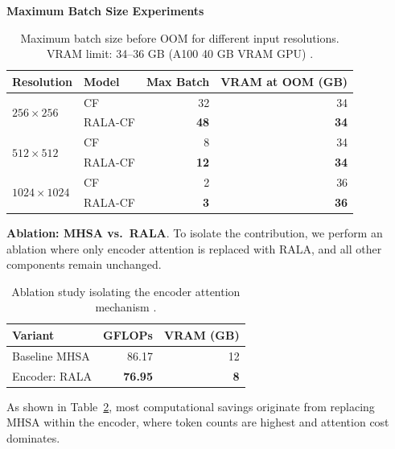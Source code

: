 \documentclass[runningheads]{llncs}
\begin{document}
\noindent \textbf{Maximum Batch Size Experiments}

\begin{table}
\caption{Maximum batch size before OOM for different input resolutions. VRAM limit: 34--36 GB (A100 40 GB VRAM GPU) \cite{acuna2026efficient}.}
\label{tab:batch_multires}
\centering
\begin{tabularx}{\textwidth}{|l|X|r|r|}
\hline
\textbf{Resolution} & \textbf{Model} & \textbf{Max Batch} & \textbf{VRAM at OOM (GB)} \\
\hline
\multirow{2}{*}{$256\times256$}
  & CF      & 32 & 34 \\
  & RALA-CF & \textbf{48} & \textbf{34} \\
\hline
\multirow{2}{*}{$512\times512$}
  & CF      & 8  & 34 \\
  & RALA-CF & \textbf{12} & \textbf{34} \\
\hline
\multirow{2}{*}{$1024\times1024$}
  & CF      & 2  & 36 \\
  & RALA-CF & \textbf{3}  & \textbf{36} \\
\hline
\end{tabularx}
\end{table}

\noindent \textbf{Ablation: MHSA vs.\ RALA}. To isolate the contribution, we
perform an ablation where only encoder attention is replaced with RALA, and all
other components remain unchanged.

\begin{table}
\caption{Ablation study isolating the encoder attention mechanism \cite{acuna2026efficient}.}
\label{tab:ablation}
\centering
\begin{tabularx}{\textwidth}{|X|r|r|}
\hline
\textbf{Variant} & \textbf{GFLOPs} & \textbf{VRAM (GB)} \\
\hline
Baseline MHSA & 86.17 & 12 \\
\rowcolor{pastelorange}
Encoder: RALA & \textbf{76.95} & \textbf{8} \\
\hline
\end{tabularx}
\end{table}

\noindent As shown in Table~\ref{tab:ablation}, most computational savings
originate from replacing MHSA within the encoder, where token counts are
highest and attention cost dominates.
\end{document}
